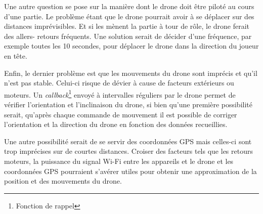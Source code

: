 Une autre question se pose sur la manière dont le drone doit être piloté au cours d'une partie. Le problème étant que le drone pourrait avoir à se déplacer sur des distances imprévisibles. Et si les mènent la partie à tour de rôle, le drone ferait des allers- retours fréquents. Une solution serait de décider d'une fréquence, par exemple toutes les 10 secondes, pour déplacer le drone dans la direction du joueur en tête.

Enfin, le dernier problème est que les mouvements du drone sont imprécis et qu'il n'est pas stable. Celui-ci risque de dévier à cause de facteurs extérieurs ou moteurs. Un \textit{callback}\footnote{Fonction de rappel} envoyé à intervalles réguliers par le drone permet de vérifier l'orientation et l'inclinaison du drone, si bien qu'une première possibilité serait, qu'après chaque commande de mouvement il est possible de corriger l'orientation et la direction du drone en fonction des données recueillies.

Une autre possibilité serait de se servir des coordonnées GPS mais celles-ci sont trop imprécises sur de courtes distances. Croiser des facteurs tels que les retours moteurs, la puissance du signal Wi-Fi entre les appareils et le drone et les coordonnées GPS pourraient s'avérer utiles pour obtenir une approximation de la position et des mouvements du drone.

